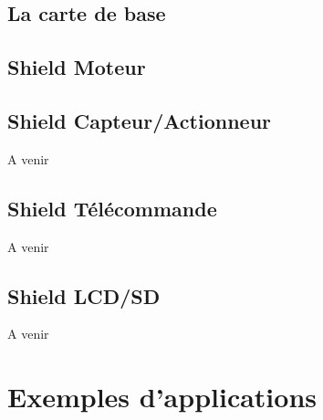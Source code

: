 \documentclass[a4paper]{article}
\begin{document}
	\subsection{La carte de base}
	
	\subsection{Shield Moteur}
	
	\subsection{Shield Capteur/Actionneur}
	
	A venir
	
	\subsection{Shield Télécommande}
	
	A venir
	
	\subsection{Shield LCD/SD}
	
	A venir
	
\section{Exemples d'applications}
\end{document}
